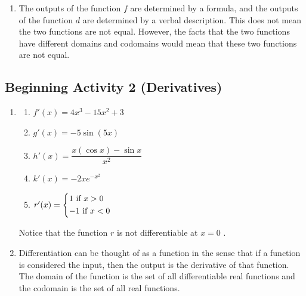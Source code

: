 \documentclass[11pt]{article}
\begin{document}
\begin{enumerate}

\item The outputs of the function  $f$  are determined  by a formula, and the outputs of the function  $d$  are determined by a verbal description. This does not mean the two functions are not equal.  However, the facts that the two functions have different domains and codomains would mean that these two functions are not equal.
\end{enumerate}
\hbreak



\subsection*{Beginning Activity 2 (Derivatives)}
\begin{enumerate}
\item \begin{multicols}{2}
\begin{enumerate}
\item $f'( x ) = 4x^3  - 15x^2  + 3$
\item $g'( x ) =  - 5\sin ( {5x} )$
\item $h'( x ) = \dfrac{{x( {\cos x} ) - \sin x}}{{x^2 }}$
\item $k'( x ) =  - 2xe^{ - x^2 } $
\item $r'( x ) = \left\{ \begin{gathered}  1\text{     if  }x > 0 \hfill \\   - 1\text{  if  }x < 0 \hfill \\ \end{gathered}  \right.$
\end{enumerate}
\end{multicols}
Notice that the function  $r$  is not differentiable at $x=0$  .

\item Differentiation can be thought of as a function in the sense that if a function is considered the input, then the output is the derivative of that function.  The domain of the function is the set of all differentiable real functions and the codomain is the set of all real functions.
\end{enumerate}
\hbreak
\end{document}
